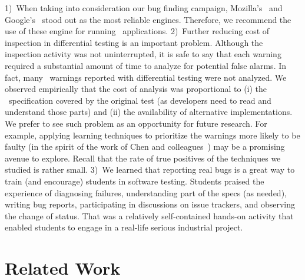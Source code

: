 \documentclass[smallextended]{svjour3}
\begin{document}
1)~When taking into consideration our bug finding campaign, Mozilla's
\smonkey\ and Google's \veight\ stood out as the most reliable
engines. Therefore, we recommend the use of these engine for running
\js\ applications. 2)~Further reducing cost of inspection in
differential testing is an important problem. Although the inspection
activity was not uninterrupted, it is safe to say that each warning
required a substantial amount of time to analyze for potential false
alarms. In fact, many \hi\ warnings reported with differential testing
were not analyzed. We observed empirically that the cost of analysis
was proportional to (i) the \js\ specification covered by the original
test (as developers need to read and understand those parts) and (ii)
the availability of alternative implementations. We prefer to see such
problem as an opportunity for future research. For example, applying
learning techniques to prioritize the warnings more likely to be
faulty (in the spirit of the work of Chen and
colleagues~\cite{Chen:2017:LPT:3097368.3097451}) may be a promising
avenue to explore. Recall that the rate of true positives of the
techniques we studied is rather small. 3)~We learned that reporting
real bugs is a great way to train (and encourage) students in software
testing. Students praised the experience of diagnosing failures,
understanding part of the specs (as needed), writing bug reports,
participating in discussions on issue trackers, and observing the
change of status. That was a relatively self-contained hands-on
activity that enabled students to engage in a real-life serious
industrial project.

\section{Related Work}
\label{sec:related-work}
\end{document}
